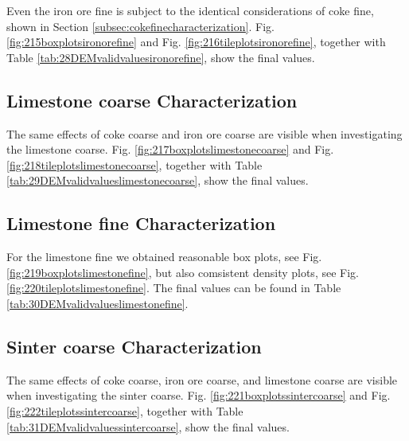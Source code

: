 Even the iron ore fine is subject to the identical considerations of coke
fine, shown in Section \ref{subsec:cokefinecharacterization}.
Fig. \ref{fig:215boxplotsironorefine} and Fig.
\ref{fig:216tileplotsironorefine}, together with Table
\ref{tab:28DEMvalidvaluesironorefine}, show the final values.






\subsection{Limestone coarse Characterization}
\label{subsec:limestonecoarsecharacterization}

The same effects of coke coarse and iron ore coarse are visible when
investigating the limestone coarse.
Fig. \ref{fig:217boxplotslimestonecoarse} and Fig.
\ref{fig:218tileplotslimestonecoarse}, together with Table
\ref{tab:29DEMvalidvalueslimestonecoarse}, show the final values.






\subsection{Limestone fine Characterization}
\label{subsec:limestonefinecharacterization}

For the limestone fine we obtained reasonable box plots, see Fig.
\ref{fig:219boxplotslimestonefine}, but also comsistent density plots, see Fig.
\ref{fig:220tileplotslimestonefine}.
The final values can be found in Table \ref{tab:30DEMvalidvalueslimestonefine}.





\subsection{Sinter coarse Characterization}
\label{subsec:sintercoarsecharacterization}

The same effects of coke coarse, iron ore coarse, and limestone coarse are
visible when investigating the sinter coarse.
Fig. \ref{fig:221boxplotssintercoarse} and Fig.
\ref{fig:222tileplotssintercoarse}, together with Table
\ref{tab:31DEMvalidvaluessintercoarse}, show the final values.


